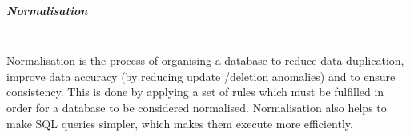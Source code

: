 \documentclass[../../main.tex]{subfiles}
\begin{document}
\subparagraph{Normalisation}

\noindent \\ Normalisation is the process of organising a database
to reduce data duplication, improve data accuracy (by reducing update
/deletion anomalies) and to ensure consistency. This is done by applying
a set of rules which must be fulfilled in order for a database to be
considered normalised. Normalisation also helps to make SQL queries
simpler, which makes them execute more efficiently.
\end{document}
